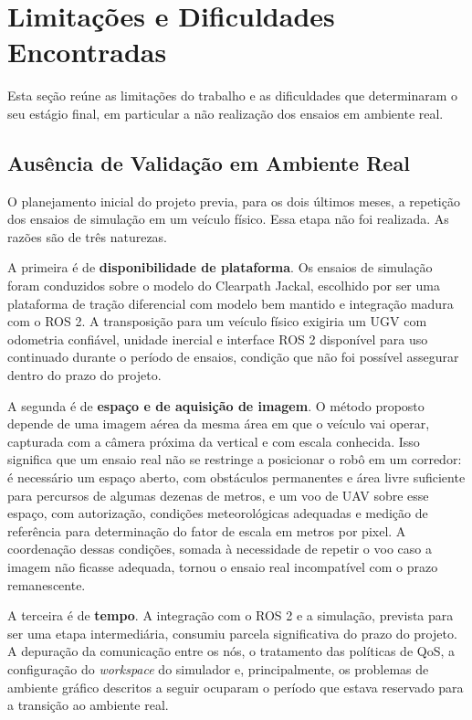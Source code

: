 \documentclass[
    12pt,
    openright,
    oneside,
    a4paper,
    english,
    brazil
]{abntex2}
\begin{document}
\section{Limitações e Dificuldades Encontradas}
\label{sec:limitacoes}

Esta seção reúne as limitações do trabalho e as dificuldades que determinaram o seu estágio final, em particular a não realização dos ensaios em ambiente real.

\subsection{Ausência de Validação em Ambiente Real}

O planejamento inicial do projeto previa, para os dois últimos meses, a repetição dos ensaios de simulação em um veículo físico. Essa etapa não foi realizada. As razões são de três naturezas.

A primeira é de \textbf{disponibilidade de plataforma}. Os ensaios de simulação foram conduzidos sobre o modelo do Clearpath Jackal, escolhido por ser uma plataforma de tração diferencial com modelo bem mantido e integração madura com o ROS 2. A transposição para um veículo físico exigiria um UGV com odometria confiável, unidade inercial e interface ROS 2 disponível para uso continuado durante o período de ensaios, condição que não foi possível assegurar dentro do prazo do projeto.

A segunda é de \textbf{espaço e de aquisição de imagem}. O método proposto depende de uma imagem aérea da mesma área em que o veículo vai operar, capturada com a câmera próxima da vertical e com escala conhecida. Isso significa que um ensaio real não se restringe a posicionar o robô em um corredor: é necessário um espaço aberto, com obstáculos permanentes e área livre suficiente para percursos de algumas dezenas de metros, e um voo de UAV sobre esse espaço, com autorização, condições meteorológicas adequadas e medição de referência para determinação do fator de escala em metros por pixel. A coordenação dessas condições, somada à necessidade de repetir o voo caso a imagem não ficasse adequada, tornou o ensaio real incompatível com o prazo remanescente.

A terceira é de \textbf{tempo}. A integração com o ROS 2 e a simulação, prevista para ser uma etapa intermediária, consumiu parcela significativa do prazo do projeto. A depuração da comunicação entre os nós, o tratamento das políticas de QoS, a configuração do \textit{workspace} do simulador e, principalmente, os problemas de ambiente gráfico descritos a seguir ocuparam o período que estava reservado para a transição ao ambiente real.
\end{document}
